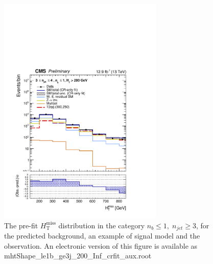 \clearpage
\begin{figure}[tbhp]
    \caption{ 
    The pre-fit $H_{\mathrm{T}}^{\mathrm{miss}}$ distribution in the category $n_{b}\leq 1, \; n_{jet} \geq 3$, 
    for the predicted background, an example of signal model and the observation.
    An electronic version of this figure is available as mhtShape\_le1b\_ge3j\_200\_Inf\_crfit\_aux.root
    \label{fig:mhtShape_le1b_ge3j_crfit} }
  \begin{center}
  \includegraphics[width=0.7\textwidth]{mhtShape_le1b_ge3j_200_Inf_crfit_aux}
  \end{center}
\end{figure}


